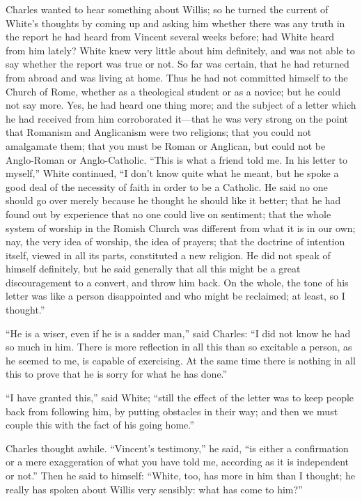 Charles wanted to hear something about Willis; so he turned the
current of White's thoughts by coming up and asking him whether there
was any truth in the report he had heard from Vincent several weeks
before; had White heard from him lately? White knew very little about
him definitely, and was not able to say whether the report was true or
not. So far was certain, that he had returned from abroad and was
living at home. Thus he had not committed himself to the Church
of Rome, whether as a theological student or as a novice; but he could
not say more. Yes, he had heard one thing more; and the subject of a
letter which he had received from him corroborated it—that he was
very strong on the point that Romanism and Anglicanism were two
religions; that you could not amalgamate them; that you must be Roman
or Anglican, but could not be Anglo-Roman or Anglo-Catholic.
``This is what a friend told me. In his letter to myself,''
White continued, ``I don't know quite what he meant, but he spoke
a good deal of the necessity of faith in order to be a Catholic. He
said no one should go over merely because he thought he should like it
better; that he had found out by experience that no one could live on
sentiment; that the whole system of worship in the Romish Church was
different from what it is in our own; nay, the very idea of worship,
the idea of prayers; that the doctrine of intention itself, viewed in
all its parts, constituted a new religion. He did not speak of himself
definitely, but he said generally that all this might be a great
discouragement to a convert, and throw him back. On the whole, the
tone of his letter was like a person disappointed and who might be
reclaimed; at least, so I thought.''

``He is a wiser, even if he is a sadder man,'' said
Charles: ``I did not know he had so much in him. There is more
reflection in all this than so excitable a person, as he seemed to me,
is capable of exercising. At the same time there is nothing in all
this to prove that he is sorry for what he has done.''

``I have granted this,'' said White; ``still the effect
of the letter was to keep people back from following him, by putting
obstacles in their way; and then we must couple this with the fact of
his going home.''

Charles thought awhile. ``Vincent's testimony,'' he said,
``is either a confirmation or a mere exaggeration of what you have
told me, according as it is independent or not.'' Then he said to
himself: ``White, too, has more in him than I thought; he really
has spoken about Willis very sensibly: what has come to him?''

